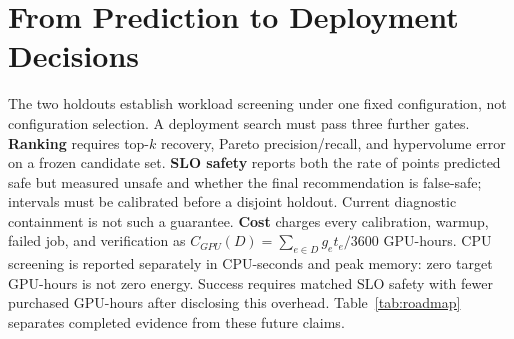 \section{From Prediction to Deployment Decisions}

The two holdouts establish workload screening under one fixed configuration, not
configuration selection.  A deployment search must pass three further gates.
\textbf{Ranking} requires top-$k$ recovery, Pareto precision/recall, and
hypervolume error on a frozen candidate set.  \textbf{SLO safety} reports both
the rate of points predicted safe but measured unsafe and whether the final
recommendation is false-safe; intervals must be calibrated before a disjoint
holdout.  Current diagnostic containment is not such a guarantee.
\textbf{Cost} charges every calibration, warmup, failed job, and
verification as
$C_{GPU}(D)=\sum_{e\in D}g_e t_e/3600$ GPU-hours.  CPU screening is reported
separately in CPU-seconds and peak memory: zero target GPU-hours is not zero
energy.  Success requires matched SLO safety with fewer purchased GPU-hours
after disclosing this overhead.  Table~\ref{tab:roadmap} separates completed
evidence from these future claims.


